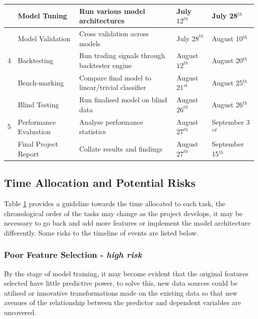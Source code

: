 \documentclass[11pt]{article}
\begin{document}
\begin{table}
\begin{tabular}{|c | l |l |l| l|}
		& Model Tuning               & Run various model architectures                                       & July $12^{th}$ & July 28$^{th}$ \\
\hline    
    		& Model Validation           & Cross validation across models                                         & July $28^{th}$ & August 10$^{th}$ \\
 4  		& Backtesting                  & Run trading signals through backtester engine                   & August $12^{th}$ & August 20$^{th}$ \\
     		& Bench-marking            & Compare final model to linear/trivial classifier                    & August $21^{st}$ & August 25$^{th}$ \\
\hline
 	    	& Blind Testing                & Run finalised model on blind data                                    & August $26^{th}$ & August 26$^{th}$\\
5       	& Performance Evaluation & Analyse performance statistics                                       & August $27^{th}$ & September 3$^{rd}$\\        %
		& Final Project Report       & Collate results and findings                        		       & August $27^{th}$ & September 15$^{th}$\\  [1ex]
\hline     %
\end{tabular} \label{table:nonlin}  %
\end{table} 
\clearpage

\subsection{Time Allocation and Potential Risks}
Table \ref{table:nonlin} provides a guideline towards the time allocated to each task, the chronological order of the tasks may change as the project develops, it may be necessary to go back and add more features or implement the model architecture differently. Some risks to the timeline of events are listed below.

\subsubsection{Poor Feature Selection - \textit{high risk}}
By the stage of model training, it may become evident that the original features selected have little predictive power, to solve this, new data sources could be utilised or innovative transformations made on the existing data so that new avenues of the relationship between the predictor and dependent variables are uncovered.
\end{document}
